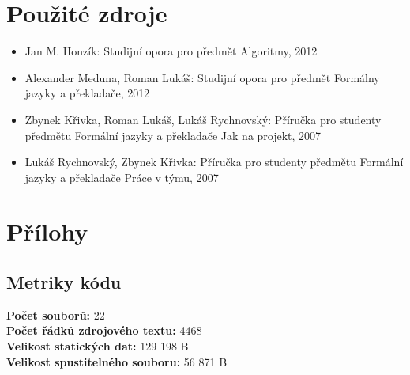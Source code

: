 \documentclass[11pt,a4paper,titlepage]{article}
\begin{document}
\newpage																										
\section{Použité zdroje}
\begin{itemize}
	\item	Jan M. Honzík: Studijní opora pro předmět Algoritmy, 2012
	\item Alexander Meduna, Roman Lukáš: Studijní opora pro předmět Formálny jazyky a překladače, 2012
	\item Zbynek Křivka, Roman Lukáš, Lukáš Rychnovský: Příručka pro studenty předmětu Formální jazyky a překladače Jak na projekt, 2007
	\item Lukáš Rychnovský, Zbynek Křivka: Příručka pro studenty předmětu Formální jazyky a překladače Práce v týmu, 2007
\end{itemize}

\bigskip
\section{Přílohy}    \label{7} 
	
	\subsection{Metriky kódu}
		\bigskip
	 	\textbf{Počet souborů:}  22\\ \newline
	 	\bigskip
	 	\textbf{Počet řádků zdrojového textu:} 4468\\
	 	\bigskip
		\textbf{Velikost statických dat:} 129 198 B       \\
	 	\bigskip
		\textbf{Velikost spustitelného souboru:} 56 871 B 
		
\end{document}
